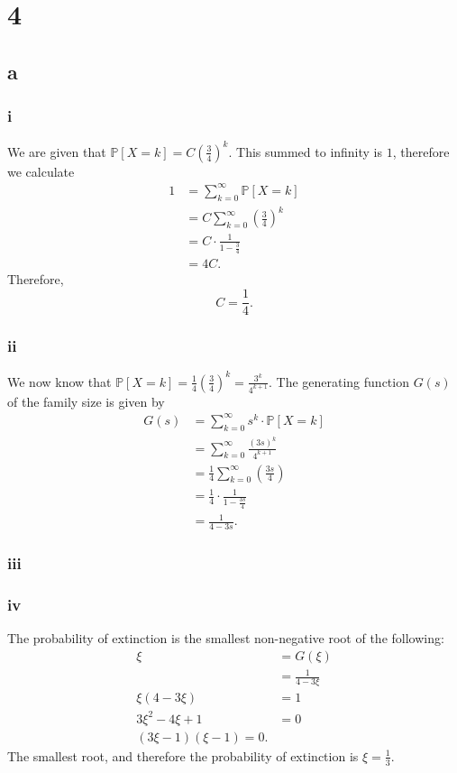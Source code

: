 \documentclass{article}
\begin{document}
\section{4}
\subsection{a}
\subsubsection{i}
We are given that $\mathbb{P}[X=k]=C\left( \frac{3}{4} \right)^k$. This summed to infinity is $1$, therefore we calculate
\begin{align}
    1 &= \sum_{k=0}^\infty \mathbb{P}[X=k]\\
    &= C\sum_{k=0}^\infty \left( \frac{3}{4} \right)^k\\
    &= C\cdot\frac{1}{1-\frac{3}{4}}\\
    &= 4C.
\end{align}
Therefore,
\begin{equation}
    C = \frac{1}{4}.
\end{equation}

\subsubsection{ii}
We now know that $\mathbb{P}[X=k]=\frac{1}{4}\left( \frac{3}{4} \right)^k = \frac{3^k}{4^{k+1}}$. The generating function $G(s)$ of the family size is given by
\begin{align}
    G(s) &= \sum_{k=0}^\infty s^k\cdot \mathbb{P}[X=k]\\
    &= \sum_{k=0}^\infty \frac{(3s)^k}{4^{k+1}}\\
    &= \frac{1}{4}\sum_{k=0}^\infty \left( \frac{3s}{4} \right)\\
    &= \frac{1}{4}\cdot \frac{1}{1-\frac{3s}{4}}\\
    &= \frac{1}{4-3s}.
\end{align}

\subsubsection{iii}

\subsubsection{iv}
The probability of extinction is the smallest non-negative root of the following:
\begin{align}
    \xi &= G(\xi)\\
    &= \frac{1}{4-3\xi}\\
    \xi(4-3\xi) &= 1\\
    3\xi^2-4\xi+1 &= 0 \\
    (3\xi-1)(\xi-1) = 0.
\end{align}
The smallest root, and therefore the probability of extinction is $\xi=\frac{1}{3}$.
\end{document}
